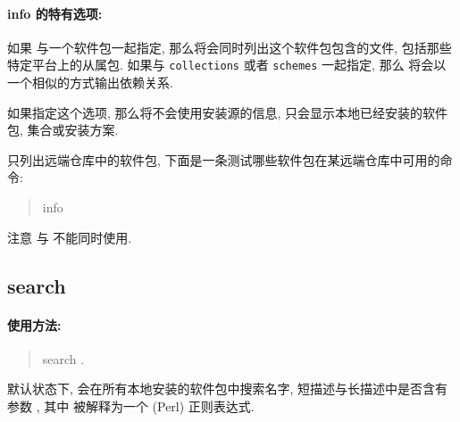 \paragraph{{\mdseries\ac{info}} 的特有选项:}
\begin{description}
    \item {}\par
    如果  与一个软件包一起指定, 那么将会同时列出这个软件包包含的文件, 包括那些特定平台上的从属包. 如果与 \texttt{collections} 或者 \texttt{schemes} 一起指定, 那么  将会以一个相似的方式输出依赖关系. 
    \item {}\par
    如果指定这个选项, 那么将不会使用安装源的信息, 只会显示本地已经安装的软件包, 集合或安装方案.
    \item {}\par
    只列出远端仓库中的软件包, 下面是一条测试哪些软件包在某远端仓库中可用的命令:
    \begin{quote}
        \tlmgr{}    \ac{info}
    \end{quote}
    注意  与  不能同时使用. 
\end{description}

\clearpage

\subsection{\mdseries\ac{search}}\label{subsec:search}

\paragraph{使用方法:}
\begin{quote}
    \tlmgr{} \ac{search} .
\end{quote}

默认状态下, \tlmgr{} 会在所有本地安装的软件包中搜索名字, 短描述与长描述中是否含有参数 , 其中  被解释为一个 (Perl) 正则表达式. 

